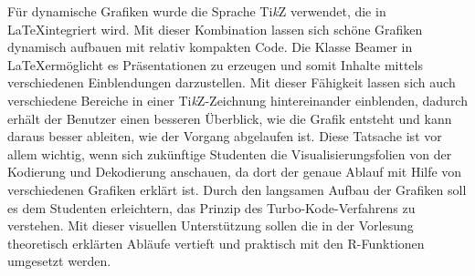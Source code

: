 Für dynamische Grafiken wurde die Sprache Ti\textit{k}Z verwendet, die in \LaTeX integriert wird. Mit dieser Kombination lassen sich schöne Grafiken dynamisch aufbauen mit relativ kompakten Code. Die Klasse Beamer in \LaTeX ermöglicht es Präsentationen zu erzeugen und somit Inhalte mittels verschiedenen Einblendungen darzustellen. Mit dieser Fähigkeit lassen sich auch verschiedene Bereiche in einer Ti\textit{k}Z-Zeichnung hintereinander einblenden, dadurch erhält der Benutzer einen besseren Überblick, wie die Grafik entsteht und kann daraus besser ableiten, wie der Vorgang abgelaufen ist. Diese Tatsache ist vor allem wichtig, wenn sich zukünftige Studenten die Visualisierungsfolien von der Kodierung und Dekodierung anschauen, da dort der genaue Ablauf mit Hilfe von verschiedenen Grafiken erklärt ist. Durch den langsamen Aufbau der Grafiken soll es dem Studenten erleichtern, das Prinzip des Turbo-Kode-Verfahrens zu verstehen. Mit dieser visuellen Unterstützung sollen die in der Vorlesung theoretisch erklärten Abläufe vertieft und praktisch mit den R-Funktionen umgesetzt werden.  